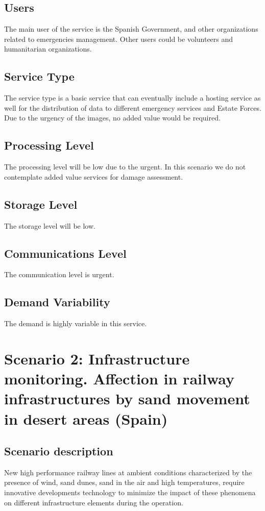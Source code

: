 \subsection{Users}
The main user of the service is the Spanish Government, and other organizations related to emergencies management. Other users could be volunteers and humanitarian organizations.
\subsection{Service Type}
The service type is a basic service that can eventually include a hosting service as well for the distribution of data to different emergency services and Estate Forces. Due to the urgency of the images, no added value would be required. 
\subsection{Processing Level}
The processing level will be low due to the urgent. In this scenario we do not contemplate added value services for damage assessment.
\subsection{Storage Level}
The storage level will be low.
\subsection{Communications Level}
The communication level is urgent.
\subsection{Demand Variability}
The demand is highly variable in this service.




\section{Scenario 2: Infrastructure monitoring. Affection in railway infrastructures by sand movement in desert areas (Spain)}
\subsection{Scenario description}
New high performance railway lines at ambient conditions characterized by the presence of wind, sand dunes, sand in the air and high temperatures, require innovative developments technology to minimize the impact of these phenomena on different infrastructure elements during the operation.
 

